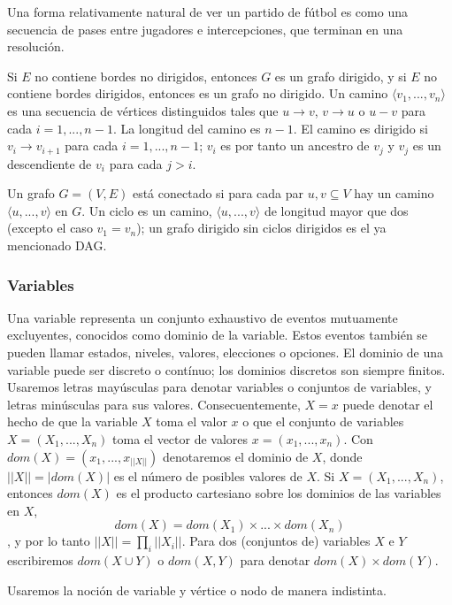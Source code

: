 Una forma relativamente natural de ver un partido de fútbol es como una secuencia de 
pases entre jugadores e intercepciones, que terminan en una resolución. 

Si $E$ no contiene bordes no dirigidos, entonces $G$ es un grafo dirigido, y si $E$ no 
contiene bordes dirigidos, entonces es un grafo no dirigido. Un camino $ \langle v_{1},...,v_{n} \rangle $ 
es una secuencia de vértices distinguidos tales que $u \rightarrow v$, $v \rightarrow u$ o $u - v$ para 
cada $i= 1,..., n-1$. La longitud del camino es $n-1$. El camino es dirigido si $v_{i} \rightarrow v_{i+1}$ 
para cada $i= 1,..., n-1$; $v_{i}$ es por tanto un ancestro de $v_{j}$ y $v_{j}$ es un descendiente de 
$v_{i}$ para cada $j > i$. 

Un grafo $G= (V, E)$ está conectado si para cada par ${u, v} \subseteq V$ hay un camino 
$\langle u,...,v \rangle$ en $G$. Un ciclo es un camino, 
$\langle u,...,v \rangle$ de longitud mayor que dos (excepto el caso $v_{1} = v_{n}$); un grafo 
dirigido sin ciclos dirigidos es el ya mencionado DAG. 

\subsubsection{Variables}
Una variable representa un conjunto exhaustivo de eventos mutuamente excluyentes, conocidos como dominio 
de la variable. Estos eventos también se pueden llamar estados, niveles, valores, elecciones o opciones. 
El dominio de una variable puede ser discreto o contínuo; los dominios discretos son siempre finitos. 
Usaremos letras mayúsculas para denotar variables o conjuntos de variables, y letras minúsculas para sus 
valores. Consecuentemente, $X = x$ puede denotar el hecho de que la variable $X$ toma el valor $x$ o que 
el conjunto de variables $X = (X_{1},...,X_{n})$ toma el vector de valores $x = (x_{1},...,x_{n})$. 
Con $dom(X)= (x_{1},...,x_{||X||})$ denotaremos el dominio de $X$, donde $||X|| = |dom(X)|$ es el número 
de posibles valores de $X$. Si $X = (X_{1},...,X_{n})$, entonces $dom(X)$ es el producto cartesiano sobre 
los dominios de las variables en $X$, $$dom(X)=dom(X_{1})\times ... \times dom(X_{n})$$, y por lo tanto 
$||X|| = \prod_i ||X_{i}||$. Para dos (conjuntos de) variables $X$ e $Y$ escribiremos $dom(X \cup Y)$ 
o $dom(X,Y)$ para denotar $dom(X) \times dom(Y)$.

Usaremos la noción de variable y vértice o nodo de manera indistinta.  

